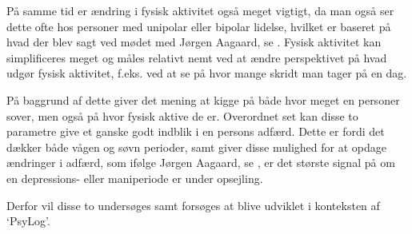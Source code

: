 På samme tid er ændring i fysisk aktivitet også meget vigtigt, da man også ser dette ofte hos personer med unipolar eller bipolar lidelse, hvilket er baseret på hvad der blev sagt ved mødet med Jørgen Aagaard, se \citep[Kapitel 1, Sektion 4]{misc:faellesrapp}. 
Fysisk aktivitet kan simplificeres meget og måles relativt nemt ved at ændre perspektivet på hvad udgør fysisk aktivitet, f.eks. ved at se på hvor mange skridt man tager på en dag.

På baggrund af dette giver det mening at kigge på både hvor meget en personer sover, men også på hvor fysisk aktive de er.
Overordnet set kan disse to parametre give et ganske godt indblik i en persons adfærd.
Dette er fordi det dækker både vågen og søvn perioder, samt giver disse mulighed for at opdage ændringer i adfærd, som ifølge Jørgen Aagaard, se \citet[Kapitel 1, Sektion 4]{misc:faellesrapp}, er det største signal på om en depressions- eller maniperiode er under opsejling. 

Derfor vil disse to undersøges samt forsøges at blive udviklet i konteksten af `PsyLog'.